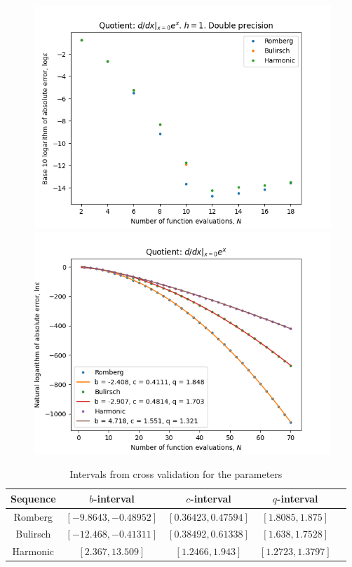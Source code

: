 \begin{figure}[H]
\centering
\begin{minipage}{0.45\textwidth}
\centering
\includegraphics[scale=0.45]{diff_quot_plots/exp_0.png}
\end{minipage}
\begin{minipage}{0.45\textwidth}
\centering
\includegraphics[scale=0.45]{diff_quot_plots/exp_0_hp_trend.png}
\end{minipage}
\end{figure}

\begin{table}[H]
    \centering
    \begin{tabular}{c|c||c|c|c}
Sequence & \(b\)-interval & \(c\)-interval & \(q\)-interval\\\hline\hline
Romberg &\([-9.8643, -0.48952]\) & \([0.36423, 0.47594]\) & \([1.8085, 1.875]\)\\
Bulirsch & \([-12.468, -0.41311]\) & \([0.38492, 0.61338]\) & \([1.638, 1.7528]\)\\
Harmonic & \([2.367, 13.509]\) & \([1.2466, 1.943]\) & \([1.2723, 1.3797]\)\\
    \end{tabular}
    \caption{Intervals from cross validation for the parameters}
    \label{tab:my_label}
\end{table}

